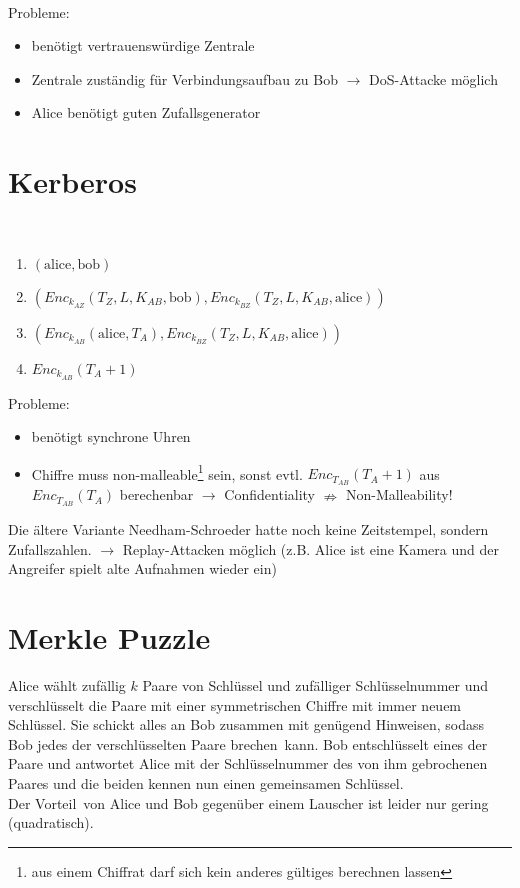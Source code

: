 \documentclass[a4paper,twoside,DIV15,BCOR12mm]{scrbook}
\begin{document}
\\

Probleme:

\begin{itemize}
	\item benötigt vertrauenswürdige Zentrale
	\item Zentrale zuständig für Verbindungsaufbau zu Bob $\rightarrow$ DoS-Attacke möglich
	\item Alice benötigt guten Zufallsgenerator
\end{itemize}

\section{Kerberos}

\\

\begin{enumerate}
	\item $(\text{alice}, \text{bob})$
	\item $({Enc}_{k_{AZ}}(T_Z, L, K_{AB}, \text{bob}), {Enc}_{k_{BZ}}(T_Z, L, K_{AB}, \text{alice}))$
	\item $({Enc}_{k_{AB}}(\text{alice}, T_A), {Enc}_{k_{BZ}}(T_Z, L, K_{AB}, \text{alice}))$
	\item ${Enc}_{k_{AB}}(T_A + 1)$
\end{enumerate}

Probleme:

\begin{itemize}
	\item benötigt synchrone Uhren
	\item Chiffre muss non-malleable\footnote{aus einem Chiffrat darf sich kein anderes gültiges berechnen lassen} sein, sonst evtl. $Enc_{T_{AB}}(T_A + 1)$ aus $Enc_{T_{AB}}(T_A)$ berechenbar $\rightarrow$ Confidentiality $\nRightarrow$ Non-Malleability!
\end{itemize}

Die ältere Variante Needham-Schroeder hatte noch keine Zeitstempel, sondern Zufallszahlen. $\rightarrow$ Replay-Attacken möglich (z.B. Alice ist eine Kamera und der Angreifer spielt alte Aufnahmen wieder ein)

\section{Merkle Puzzle}

Alice wählt zufällig $k$ Paare von Schlüssel und zufälliger Schlüsselnummer und verschlüsselt die Paare mit einer symmetrischen Chiffre mit immer neuem Schlüssel. Sie schickt alles an Bob zusammen mit genügend Hinweisen, sodass Bob jedes der verschlüsselten Paare \glqq brechen\grqq\ kann. Bob entschlüsselt eines der Paare und antwortet Alice mit der Schlüsselnummer des von ihm gebrochenen Paares und die beiden kennen nun einen gemeinsamen Schlüssel.\\ Der \glqq Vorteil\grqq\ von Alice und Bob gegenüber einem Lauscher ist leider nur gering (quadratisch).
\end{document}
